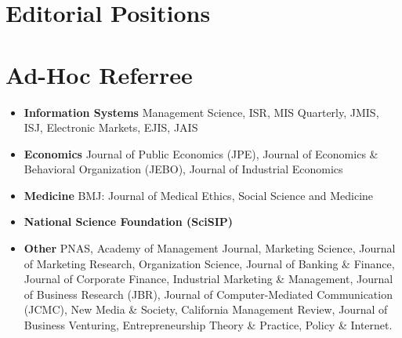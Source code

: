 \documentclass[10.5pt,letterpaper,sans]{moderncv}        %
\begin{document}



\section{Editorial Positions}


\section{Ad-Hoc Referree}

\begin{itemize}
  \item \textbf{Information Systems} \newline 
  Management Science, ISR, MIS Quarterly, JMIS, ISJ, Electronic Markets, EJIS, JAIS
  \item \textbf{Economics} \newline
  Journal of Public Economics (JPE), Journal of Economics \& Behavioral Organization (JEBO), Journal of Industrial Economics
\item \textbf{Medicine} \newline
 BMJ: Journal of Medical Ethics, Social Science and Medicine
 \item \textbf{National Science Foundation (SciSIP)}
  \item \textbf{Other} \newline 
PNAS, Academy of Management Journal, Marketing Science, Journal of Marketing Research, Organization Science, Journal of Banking \& Finance, Journal of Corporate Finance, Industrial Marketing \& Management, Journal of Business Research (JBR), Journal of Computer-Mediated Communication (JCMC), New Media \& Society, California Management Review, Journal of Business Venturing, Entrepreneurship Theory \& Practice, Policy \& Internet.
\end{itemize}
\end{document}
